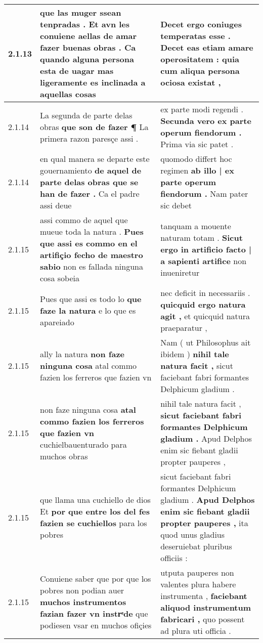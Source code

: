 \begin{tabular}{|p{1cm}|p{6.5cm}|p{6.5cm}|}
2.1.13 & que las muger ssean tenpradas . \textbf{ Et avn les conuiene aellas de amar fazer buenas obras . } Ca quando alguna persona esta de uagar mas ligeramente es inclinada a aquellas cosas & Decet ergo coniuges temperatas esse . \textbf{ Decet eas etiam amare operositatem : } quia cum aliqua persona ociosa existat , \\\hline
2.1.14 & La segunda de parte delas obras \textbf{ que son de fazer ¶ } La primera razon paresçe assi . & ex parte modi regendi . \textbf{ Secunda vero ex parte operum fiendorum . } Prima via sic patet . \\\hline
2.1.14 & en qual manera se departe este gouernamiento \textbf{ de aquel de parte delas obras que se han de fazer . } Ca el padre assi deue & quomodo differt hoc regimen \textbf{ ab illo | ex parte operum fiendorum . } Nam pater sic debet \\\hline
2.1.15 & assi commo de aquel que mueue toda la natura . \textbf{ Pues que assi es commo en el artifiçio fecho de maestro sabio } non es fallada ninguna cosa sobeia & tanquam a mouente naturam totam . \textbf{ Sicut ergo in artificio facto | a sapienti artifice } non inueniretur \\\hline
2.1.15 & Pues que assi es todo lo \textbf{ que faze la natura } e lo que es apareiado & nec deficit in necessariis . \textbf{ quicquid ergo natura agit , } et quicquid natura praeparatur , \\\hline
2.1.15 & ally la natura \textbf{ non faze ninguna cosa } atal commo fazien los ferreros que fazien vn & Nam ( ut Philosophus ait ibidem ) \textbf{ nihil tale natura facit , } sicut faciebant fabri formantes Delphicum gladium . \\\hline
2.1.15 & non faze ninguna cosa \textbf{ atal commo fazien los ferreros que fazien vn } cuchielbauenturado para muchos obras & nihil tale natura facit , \textbf{ sicut faciebant fabri formantes Delphicum gladium . } Apud Delphos enim sic fiebant gladii propter pauperes , \\\hline
2.1.15 & que llama una cuchiello de dios Et \textbf{ por que entre los del fes fazien se cuchiellos } para los pobres & sicut faciebant fabri formantes Delphicum gladium . \textbf{ Apud Delphos enim sic fiebant gladii propter pauperes , } ita quod unus gladius deseruiebat pluribus officiis : \\\hline
2.1.15 & Conuiene saber que por que los pobres non podian auer \textbf{ muchos instrumentos fazian fazer vn instrͤde } que podiesen vsar en muchos ofiçies & utputa pauperes non valentes plura habere instrumenta , \textbf{ faciebant aliquod instrumentum fabricari , } quo possent ad plura uti officia . \\\hline

\end{tabular}
